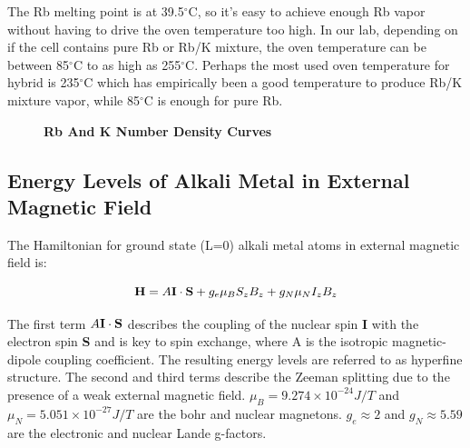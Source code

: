 The Rb melting point is at 39.5$^{\circ}$C, so it's easy to achieve enough Rb vapor without having to drive the oven temperature too high. In our lab, depending on if the cell contains pure Rb or Rb/K mixture, the oven temperature can be between 85$^{\circ}$C to as high as 255$^{\circ}$C. Perhaps the most used oven temperature for hybrid is 235$^{\circ}$C which has empirically been a good temperature to produce Rb/K mixture vapor, while 85$^{\circ}$C is enough for pure Rb.

\begin{figure}[H]
	
	\centering
	\caption[Rb And K Number Density Curves]{{\bf Rb And K Number Density Curves}}
	\label{fig:AlkaliVaporDensity}
	
\end{figure}

\subsection{Energy Levels of Alkali Metal in External Magnetic Field}

The Hamiltonian for ground state (L=0) alkali metal atoms in external magnetic field is:

\begin{equation}
{\bf H} = A{\bf I \cdot S} + g_{e} \mu_{B} S_{z}B_{z} + g_{N}{\mu_{N}}I_{z}B_{z}
\end{equation}

The first term $A{\bf I \cdot S}$ describes the coupling of the nuclear spin {\bf I} with the electron spin {\bf S} and is key to spin exchange, where A is the isotropic magnetic-dipole coupling coefficient. The resulting energy levels are referred to as hyperfine structure. The second and third terms describe the Zeeman splitting due to the presence of a weak external magnetic field. ${\mu}_{B} = 9.274 \times 10^{-24}J/T$ and ${\mu}_{N} = 5.051 \times 10^{-27}J/T$ are the bohr and nuclear magnetons. $g_{e}\approx2$ and $g_{N}\approx5.59$ are the electronic and nuclear Lande g-factors.

